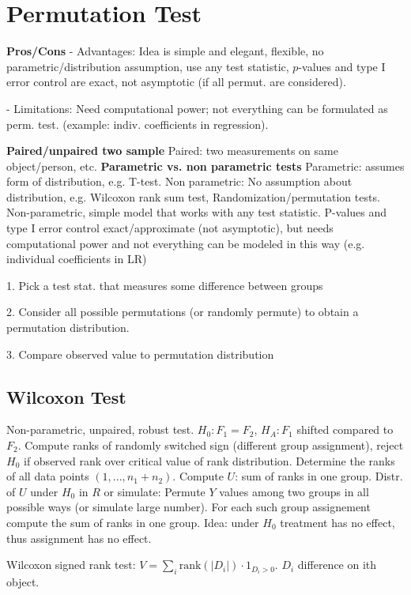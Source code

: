 \section*{Permutation Test}
\textbf{Pros/Cons}
- Advantages: Idea is simple and elegant, flexible, no parametric/distribution assumption, use any test statistic, $p$-values and type I error control are exact, not asymptotic (if all permut. are considered).

- Limitations: Need computational power; not everything can be formulated as perm. test. (example: indiv. coefficients in regression).

\textbf{Paired/unpaired two sample} Paired: two measurements on same object/person, etc.
\textbf{Parametric vs. non parametric tests} Parametric: assumes form of distribution, e.g. T-test. Non parametric: No assumption about distribution, e.g. Wilcoxon rank sum test, Randomization/permutation tests.
Non-parametric, simple model that works with any test statistic. P-values and type I error control exact/approximate (not asymptotic), but needs computational power and not everything can be modeled in this way (e.g. individual coefficients in LR)

{1. Pick a test stat. that measures some difference between groups}

  {2. Consider all possible permutations (or randomly permute) to obtain a permutation distribution.}

  {3. Compare observed value to permutation distribution}


\subsection*{Wilcoxon Test}
Non-parametric, unpaired, robust test. $H_0: F_1 = F_2$, $H_A: F_1 $ shifted compared to $F_2$. Compute ranks of randomly switched sign (different group assignment), reject $H_0$ if observed rank over critical value of rank distribution.
Determine the ranks of all data points $(1,...,n_1+n_2)$. Compute $U$: sum of ranks in one group. Distr. of $U$ under $H_0$ in $R$ or simulate: Permute $Y$ values among two groups in all possible ways (or simulate large number). For each such group assignement compute the sum of ranks in one group. Idea: under $H_0$ treatment has no effect, thus assignment has no effect.

Wilcoxon signed rank test: $V=\sum_i \text{rank}(|D_i|)\cdot 1_{D_i > 0}$. $D_i$ difference on ith object.

